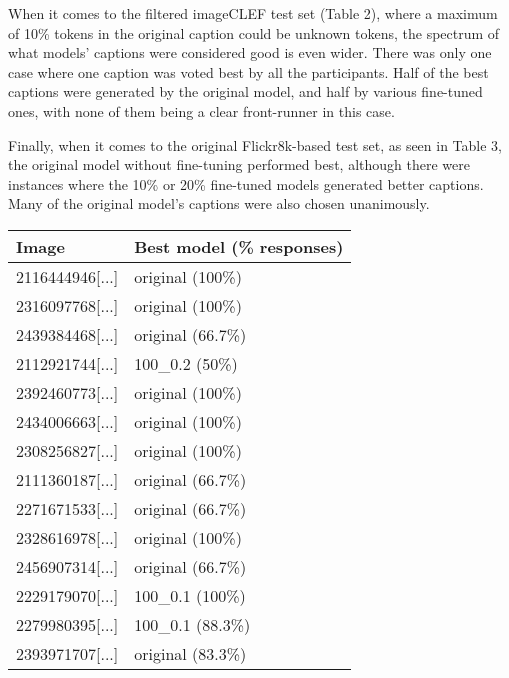 \documentclass[11pt]{article}
\begin{document}
When it comes to the filtered imageCLEF test set (Table 2), where a maximum of 10\% tokens in the original caption could be unknown tokens, the spectrum of what models' captions were considered good is even wider. There was only one case where one caption was voted best by all the participants. Half of the best captions were generated by the original model, and half by various fine-tuned ones, with none of them being a clear front-runner in this case.

Finally, when it comes to the original Flickr8k-based test set, as seen in Table 3, the original model without fine-tuning performed best, although there were instances where the 10\% or 20\% fine-tuned models generated better captions. Many of the original model's captions were also chosen unanimously.

\begin{table}[h]
    \begin{center}
        \begin{tabular}{|p{2.5cm}|p{3cm}|}
            \hline \bf Image & \bf Best model (\% responses)      \\ \hline
            2116444946[...]  & original (100\%)                   \\
            2316097768[...]  & original (100\%)                   \\
            2439384468[...]  & original (66.7\%)                  \\
            2112921744[...]  & 100\_0.2 (50\%)                    \\
            2392460773[...]  & original (100\%)                   \\
            2434006663[...]  & original (100\%)                   \\
            2308256827[...]  & original (100\%)                   \\
            2111360187[...]  & original (66.7\%)                  \\
            2271671533[...]  & original (66.7\%)                  \\
            2328616978[...]  & original (100\%)                   \\
            2456907314[...]  & original (66.7\%)                  \\
            2229179070[...]  & 100\_0.1 (100\%)                   \\
            2279980395[...]  & 100\_0.1 (88.3\%)                  \\
            2393971707[...]  & original (83.3\%)                  \\

\end{tabular}
\end{center}
\end{table}
\end{document}
